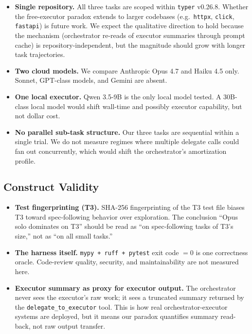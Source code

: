 \documentclass[11pt,a4paper]{article}
\begin{document}
\begin{itemize}
    \item \textbf{Single repository.} All three tasks are scoped within \texttt{typer} v0.26.8. Whether the free-executor paradox extends to larger codebases (e.g.~\texttt{httpx}, \texttt{click}, \texttt{fastapi}) is future work. We expect the qualitative direction to hold because the mechanism (orchestrator re-reads of executor summaries through prompt cache) is repository-independent, but the magnitude should grow with longer task trajectories.
    \item \textbf{Two cloud models.} We compare Anthropic Opus 4.7 and Haiku 4.5 only. Sonnet, GPT-class models, and Gemini are absent.
    \item \textbf{One local executor.} Qwen 3.5-9B is the only local model tested. A 30B-class local model would shift wall-time and possibly executor capability, but not dollar cost.
    \item \textbf{No parallel sub-task structure.} Our three tasks are sequential within a single trial. We do not measure regimes where multiple delegate calls could fan out concurrently, which would shift the orchestrator's amortization profile.
\end{itemize}

\subsection{Construct Validity}

\begin{itemize}
    \item \textbf{Test fingerprinting (T3).} SHA-256 fingerprinting of the T3 test file biases T3 toward spec-following behavior over exploration. The conclusion ``Opus solo dominates on T3'' should be read as ``on spec-following tasks of T3's size,'' not as ``on all small tasks.''
    \item \textbf{The harness itself.} \texttt{mypy + ruff + pytest} exit code $= 0$ is one correctness oracle. Code-review quality, security, and maintainability are not measured here.
    \item \textbf{Executor summary as proxy for executor output.} The orchestrator never sees the executor's raw work; it sees a truncated summary returned by the \texttt{delegate\_to\_executor} tool. This is how real orchestrator-executor systems are deployed, but it means our paradox quantifies summary read-back, not raw output transfer.
\end{itemize}
\end{document}
